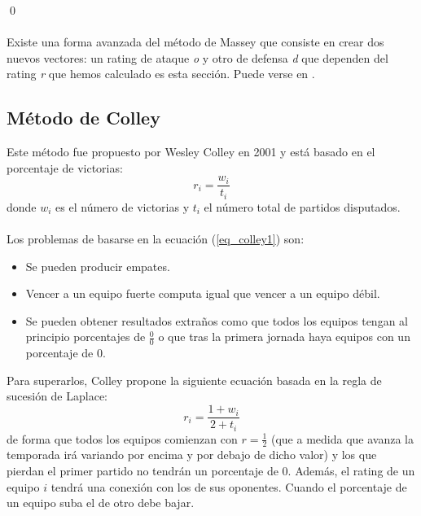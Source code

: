 \qed
\ \\
\ \\
Existe una forma avanzada del método de Massey que consiste en crear dos nuevos vectores: un rating de ataque \textit{o} y otro de defensa \textit{d} que dependen del rating \textit{r} que hemos calculado es esta sección. Puede verse en \cite[págs 11-13]{libro_rankings}.

\subsection{Método de Colley}
Este método fue propuesto por Wesley Colley en 2001 y está basado en el porcentaje de victorias:\\
\begin{equation} \label{eq_colley1}
	r_{i} = \dfrac{w_{i}}{t_{i}}
\end{equation}
donde $w_{i}$ es el número de victorias y $t_{i}$ el número total de partidos disputados.\\
\\
Los problemas de basarse en la ecuación (\ref{eq_colley1}) son:
\begin{itemize}
	\item Se pueden producir empates.
	\item Vencer a un equipo fuerte computa igual que vencer a un equipo débil.
	\item Se pueden obtener resultados extraños como que todos los equipos tengan al principio porcentajes de $\frac{0}{0}$ o que tras la primera jornada haya equipos con un porcentaje de 0.  
\end{itemize}
Para superarlos, Colley propone la siguiente ecuación basada en la regla de sucesión de Laplace:
\begin{equation} \label{eq2.5}
	r_{i} = \dfrac{1+w_{i}}{2+t_{i}}
\end{equation}
de forma que todos los equipos comienzan con $r=\frac{1}{2}$ (que a medida que avanza la temporada irá variando por encima y por debajo de dicho valor) y los que pierdan el primer partido no tendrán un porcentaje de 0. Además, el rating de un equipo $i$ tendrá una conexión con los de sus oponentes. Cuando el porcentaje de un equipo suba el de otro debe bajar.\\

